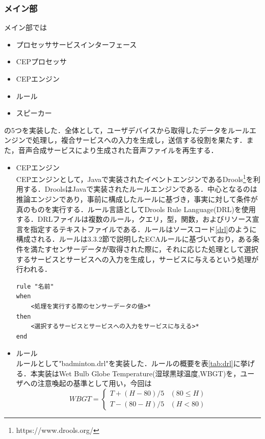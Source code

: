\documentclass{kuisthesis}			%
\begin{document}
\subsubsection{メイン部}
メイン部では
\begin{itemize}
\item プロセッササービスインターフェース
\item CEPプロセッサ
\item CEPエンジン
\item ルール
\item スピーカー
\end{itemize}
の5つを実装した．全体として，ユーザデバイスから取得したデータをルールエンジンで処理し，複合サービスへの入力を生成し，送信する役割を果たす．また，音声合成サービスにより生成された音声ファイルを再生する．
\begin{itemize}
\item CEPエンジン\\
CEPエンジンとして，Javaで実装されたイベントエンジンであるDrools\footnote{https://www.drools.org/}を利用する．DroolsはJavaで実装されたルールエンジンである．中心となるのは推論エンジンであり，事前に構成したルールに基づき，事実に対して条件が真のものを実行する．ルール言語としてDrools Rule Language(DRL)を使用する．DRLファイルは複数のルール，クエリ，型，関数，およびリソース宣言を指定するテキストファイルである．ルールはソースコード\ref{drl}のように構成される．ルールは3.3.2節で説明したECAルールに基づいており，ある条件を満たすセンサーデータが取得された際に，それに応じた処理として選択するサービスとサービスへの入力を生成し，サービスに与えるという処理が行われる．
\begin{lstlisting}[caption=drlファイル仕様,label=drl]
rule "名前"
when
    <処理を実行する際のセンサーデータの値>*
then
    <選択するサービスとサービスへの入力をサービスに与える>*
end
\end{lstlisting}
\item ルール\\
ルールとして"badminton.drl"を実装した．ルールの概要を表\ref{tab:drl}に挙げる．本実装はWet Bulb Globe Temperature(湿球黒球温度,WBGT)を，ユーザへの注意喚起の基準として用い，今回は
\begin{equation}
WBGT = \begin{cases}
T + (H - 80)/5 & (80 \leq H) \\
T -(80 -H)/5 & (H < 80)
\end{cases}
\label{wbgt}
\end{equation}
\begin{flushright}

\end{flushright}
\end{itemize}
\end{document}
